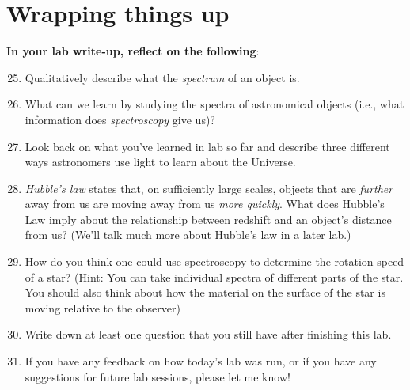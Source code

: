 \documentclass[11pt]{article}
\begin{document}
\section{Wrapping things up}
\textbf{In your lab write-up, reflect on the following}:
\begin{enumerate}
    \setcounter{enumi}{24}
    
    \item Qualitatively describe what the \emph{spectrum} of an object is.
    
    \item What can we learn by studying the spectra of astronomical objects (i.e., what information does \emph{spectroscopy} give us)?
    
    \item Look back on what you've learned in lab so far and describe three different ways astronomers use light to learn about the Universe.
    
    \item \emph{Hubble's law} states that, on sufficiently large scales, objects that are \emph{further} away from us are moving away from us \emph{more quickly}. What does Hubble's Law imply about the relationship between redshift and an object's distance from us? (We'll talk much more about Hubble's law in a later lab.)
    
    \item How do you think one could use spectroscopy to determine the rotation speed of a star? (Hint: You can take individual spectra of different parts of the star. You should also think about how the material on the surface of the star is moving relative to the observer)
    
    \item Write down at least one question that you still have after finishing this lab.
    
    \item If you have any feedback on how today's lab was run, or if you have any suggestions for future lab sessions, please let me know!
    
\end{enumerate}
\end{document}
